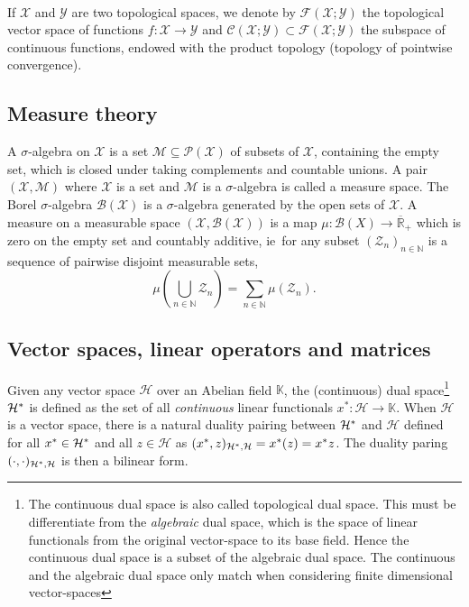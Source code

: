 \paragraph{}
If $\mathcal{X}$ and $\mathcal{Y}$ are two topological spaces, we denote by
$\mathcal{F}(\mathcal{X};\mathcal{Y})$ the topological vector space of
functions $f:\mathcal{X}\to\mathcal{Y}$ and
$\mathcal{C}(\mathcal{X};\mathcal{Y}) \subset
\mathcal{F}(\mathcal{X};\mathcal{Y})$ the subspace of continuous functions,
endowed with the product topology (topology of pointwise convergence).

\subsection{Measure theory}
A $\sigma$-algebra on $\mathcal{X}$ is a set
$\mathcal{M}\subseteq\mathcal{P}(\mathcal{X})$ of subsets of $\mathcal{X}$,
containing the empty set, which is closed under taking complements and
countable unions. A pair $(\mathcal{X},\mathcal{M})$ where $\mathcal{X}$ is a
set and $\mathcal{M}$ is a $\sigma$-algebra is called a measure space. The
Borel $\sigma$-algebra $\mathcal{B}(\mathcal{X})$ is a $\sigma$-algebra
generated by the open sets of $\mathcal{X}$. A measure on a measurable space
$(\mathcal{X},\mathcal{B}(\mathcal{X}))$ is a map $\mu: \mathcal{B}(X) \to
\overline{\mathbb{R}}_+$ which is zero on the empty set and countably additive,
\acs{ie}~for any subset $(\mathcal{Z}_n)_{n\in\mathbb{N}}$ is a sequence of
pairwise disjoint measurable sets, 
\begin{dmath*}
    \mu\left(\bigcup_{n\in\mathbb{N}}\mathcal{Z}_n\right) =
    \sum_{n\in\mathbb{N}}\mu(\mathcal{Z}_n).
\end{dmath*}

\subsection{Vector spaces, linear operators and matrices}
Given any vector space $\mathcal{H}$ over an Abelian field $\mathbb{K}$, the
(continuous) dual space\footnote{The continuous dual space is also called
topological dual space. This must be differentiate from the \emph{algebraic}
dual space, which is the space of linear functionals from the original
vector-space to its base field. Hence the continuous dual space is a subset of
the algebraic dual space. The continuous and the algebraic dual space only
match when considering finite dimensional vector-spaces} $\mathcal{H}^*$
is defined as the set of all \emph{continuous} linear functionals $x^*:
\mathcal{H} \to \mathbb{K}$. When $\mathcal{H}$ is a vector space, there is a
natural duality pairing between $\mathcal{H}^*$ and $\mathcal{H}$
defined for all $x^*\in\mathcal{H}^*$ and all $z\in\mathcal{H}$
as $(x^*, z)_{\mathcal{H}^*, \mathcal{H}} = x^*(z)
= x^* z$. The duality paring $(\cdot,
\cdot)_{\mathcal{H}^*,\mathcal{H}}$ is then a bilinear form.
